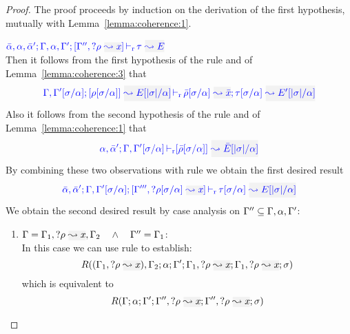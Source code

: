\begin{proof}
The proof proceeds by induction on the derivation of the first hypothesis, mutually with Lemma~\ref{lemma:coherence:1}.
\begin{description}
\setlength{\itemsep}{1em}
\item[\fbox{\rref{L-RuleMatch}}]\quad$
\dlres{\bar{\alpha},\alpha,\bar{\alpha}'}{\tenv,\alpha,\tenv'}{\tenv'',\envi{\rulet}{x}}{\type}{E}$ \ \\

  Then it follows from the first hypothesis of the rule and of Lemma~\ref{lemma:coherence:3}
  that
\begin{equation*}
\dmres{\tenv,\tenv'[\suty/\alpha]}{\rulet[\suty/\alpha]}{E[|\suty|/\alpha]}{\type[\suty/\alpha]}{E'[|\suty|/\alpha]}{\ie{\ruleset[\suty/\alpha]}{\bar{x}}}
\end{equation*}
  Also it follows from the second hypothesis of the rule and of Lemma~\ref{lemma:coherence:1}
  that
\begin{equation*}
\drres{{\alpha},\bar{\alpha}'}{\tenv,\tenv'[\suty/\alpha]}{\ruleset[\suty/\alpha]}{\bar{E}[|\suty|/\alpha]}
\end{equation*}
  By combining these two observations with rule  we obtain the first desired result
\begin{equation*}
\dlres{\bar{\alpha},\bar{\alpha}'}{\tenv,\tenv'[\suty/\alpha]}{\tenv''',\envi{\rulet[\suty/\alpha]}{x}}{\type[\suty/\alpha]}{E[|\suty|/\alpha]}
\end{equation*}  
  We obtain the second desired result by case analysis on $\Gamma'' \subseteq \Gamma,\alpha,\Gamma'$:
  \begin{enumerate}
  \item $\tenv = \tenv_1,\envi{\rulet}{x},\tenv_2 \quad\wedge\quad \tenv'' = \tenv_1$: \\
  In this case we can use rule  to establish:
\begin{equation*}
  R((\tenv_1,\envi{\rulet}{x}),\tenv_2;\alpha;\tenv';\tenv_1,\envi{\rulet}{x};\tenv_1,\envi{\rulet}{x};\sigma)
\end{equation*}
  which is equivalent to
\begin{equation*}
  R(\tenv;\alpha;\tenv';\tenv'',\envi{\rulet}{x};\tenv'',\envi{\rulet}{x};\sigma)
\end{equation*}


\end{enumerate}
\end{description}
\end{proof}
